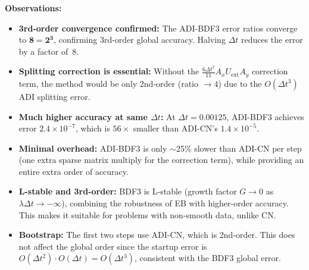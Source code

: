 \documentclass[11pt]{article}
\begin{document}
\noindent\textbf{Observations:}
\begin{itemize}[nosep]
  \item \textbf{3rd-order convergence confirmed:} The ADI-BDF3 error ratios converge
        to $\mathbf{8 = 2^3}$, confirming 3rd-order global accuracy. Halving $\Delta t$
        reduces the error by a factor of~8.
  \item \textbf{Splitting correction is essential:} Without the
        $\tfrac{6\Delta t^2}{11}A_x U_{\mathrm{ext}} A_y$ correction term,
        the method would be only 2nd-order (ratio $\to 4$) due to the $O(\Delta t^3)$
        ADI splitting error.
  \item \textbf{Much higher accuracy at same $\Delta t$:} At $\Delta t = 0.00125$,
        ADI-BDF3 achieves error $2.4 \times 10^{-7}$, which is $56\times$ smaller
        than ADI-CN's $1.4 \times 10^{-5}$.
  \item \textbf{Minimal overhead:} ADI-BDF3 is only $\sim$25\% slower than ADI-CN
        per step (one extra sparse matrix multiply for the correction term),
        while providing an entire extra order of accuracy.
  \item \textbf{L-stable and 3rd-order:} BDF3 is L-stable (growth factor $G \to 0$
        as $\lambda\Delta t \to -\infty$), combining the robustness of EB with
        higher-order accuracy. This makes it suitable for problems with non-smooth
        data, unlike CN.
  \item \textbf{Bootstrap:} The first two steps use ADI-CN, which is 2nd-order.
        This does not affect the global order since the startup error is
        $O(\Delta t^2) \cdot O(\Delta t) = O(\Delta t^3)$, consistent with
        the BDF3 global error.
\end{itemize}
\end{document}
